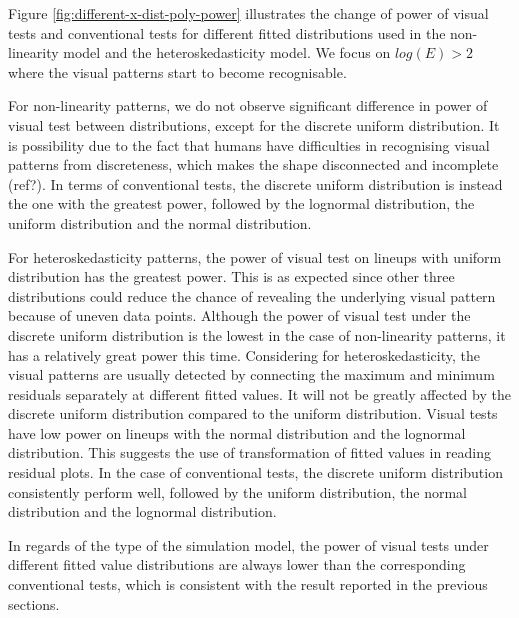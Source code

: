 \documentclass[]{interact}
\theoremstyle{plain}%
\theoremstyle{definition}
\theoremstyle{remark}
\begin{document}
Figure \ref{fig:different-x-dist-poly-power} illustrates the change of
power of visual tests and conventional tests for different fitted
distributions used in the non-linearity model and the heteroskedasticity
model. We focus on \(log(E) > 2\) where the visual patterns start to
become recognisable.

For non-linearity patterns, we do not observe significant difference in
power of visual test between distributions, except for the discrete
uniform distribution. It is possibility due to the fact that humans have
difficulties in recognising visual patterns from discreteness, which
makes the shape disconnected and incomplete (ref?). In terms of
conventional tests, the discrete uniform distribution is instead the one
with the greatest power, followed by the lognormal distribution, the
uniform distribution and the normal distribution.

For heteroskedasticity patterns, the power of visual test on lineups
with uniform distribution has the greatest power. This is as expected
since other three distributions could reduce the chance of revealing the
underlying visual pattern because of uneven data points. Although the
power of visual test under the discrete uniform distribution is the
lowest in the case of non-linearity patterns, it has a relatively great
power this time. Considering for heteroskedasticity, the visual patterns
are usually detected by connecting the maximum and minimum residuals
separately at different fitted values. It will not be greatly affected
by the discrete uniform distribution compared to the uniform
distribution. Visual tests have low power on lineups with the normal
distribution and the lognormal distribution. This suggests the use of
transformation of fitted values in reading residual plots. In the case
of conventional tests, the discrete uniform distribution consistently
perform well, followed by the uniform distribution, the normal
distribution and the lognormal distribution.

In regards of the type of the simulation model, the power of visual
tests under different fitted value distributions are always lower than
the corresponding conventional tests, which is consistent with the
result reported in the previous sections.
\end{document}
